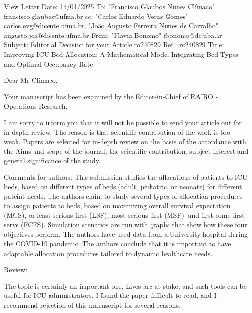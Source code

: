 View Letter
Date:	14/01/2025
To:	"Francisco Glaubos Nunes Clímaco" francisco.glaubos@ufma.br
cc:	"Carlos Eduardo Veras Gomes" carlos.evg@dicente.ufma.br, "João Augusto Ferreira Nunes de Carvalho" augusto.joa@dicente.ufma.br
From:	"Flavia Bonomo" fbonomo@dc.uba.ar
Subject:	Editorial Decision for your Article ro240829
Ref.: ro240829
Title: Improving ICU Bed Allocation: A Mathematical Model Integrating Bed Types and Optimal Occupancy Rate


Dear Mr Clímaco,

Your manuscript has been examined by the Editor-in-Chief of RAIRO - Operations Research.

I am sorry to inform you that it will not be possible to send your article out for in-depth review. The reason is
that scientific contribution of the work is too weak.
Papers are selected for in-depth review on the basis of the accordance with the Aims and scope of the journal, the scientific contribution, subject interest and general significance of the study.


Comments for authors:
This submission studies the allocations of patients to ICU beds, based on different types of beds (adult, pediatric, or neonate) for different pateint needs. The authors claim to study several types of allocation procedures to assign patients to beds, based on maximizing overall survival expectation (MGS), or least serious first (LSF), most serious first (MSF), and first come first serve (FCFS). Simulation scenarios are run with graphs that show how these four objectives perform. The authors have used data from a University hospital during the COVID-19 pandemic. The authors conclude that it is important to have adaptable allocation procedures tailored to dynamic healthcare needs.

Review:

The topic is certainly an important one. Lives are at stake, and such tools can be useful for ICU administrators. I found the paper difficult to read, and I recommend rejection of this manuscript for several reasons.

